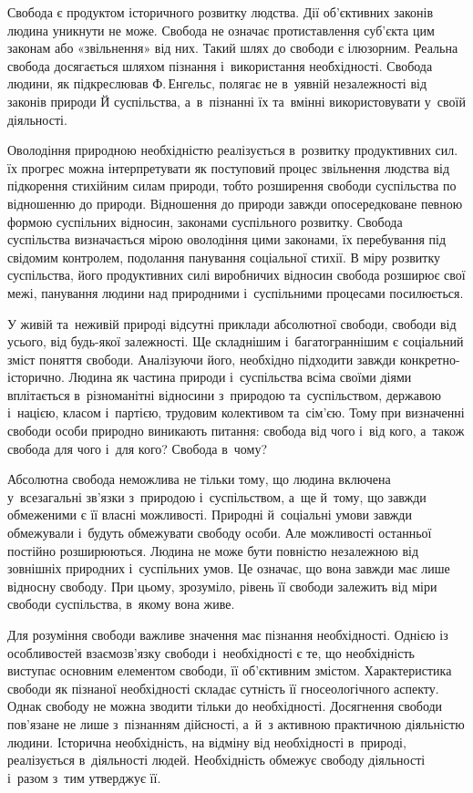\documentclass[a5paper,oneside,DIV=12,12pt,headings=small]{scrartcl}
\begin{document}
		Свобода є продуктом історичного розвитку людства. Дії об'\-єк\-тив\-них законів людина уникнути не може. Свобода не означає протиставлення суб'\-єкта цим законам або «звільнення» від них. Такий шлях до свободи є ілюзорним. Реальна свобода досягається шляхом пізнання і~використання необхідності. Свобода людини, як підкреслював Ф.\,Енгельс, полягає не в~уявній незалежності від законів природи Й суспільства, а~в~пізнанні їх та~вмінні використовувати у~своїй діяльності.
		
		Оволодіння природною необхідністю реалізується в~розвитку продуктивних сил. їх прогрес можна інтерпретувати як поступовий процес звільнення людства від підкорення стихійним силам природи, тобто розширення свободи суспільства по відношенню до природи. Відношення до природи завжди опосередковане певною формою суспільних відносин, законами суспільного розвитку. Свобода суспільства визначається мірою оволодіння цими законами, їх перебування під свідомим контролем, подолання панування соціальної стихії. В міру розвитку суспільства, його продуктивних силі виробничих відносин свобода розширює свої межі, панування людини над природними і~суспільними процесами посилюється.
		
		У живій та~неживій природі відсутні приклади абсолютної свободи, свободи від усього, від будь-якої залежності. Ще складнішим і~багатограннішим є соціальний зміст поняття свободи. Аналізуючи його, необхідно підходити завжди конкретно-історично. Людина як частина природи і~суспільства всіма своїми діями вплітається в~різноманітні відносини з~природою та~суспільством, державою і~нацією, класом і~партією, трудовим колективом та~сім'єю. Тому при визначенні свободи особи природно виникають питання: свобода від чого і~від кого, а~також свобода для чого і~для кого? Свобода в~чому?
		
		Абсолютна свобода неможлива не тільки тому, що людина включена у~всезагальні зв'язки з~природою і~суспільством, а~ще й~тому, що завжди обмеженими є її власні можливості. Природні й~соціальні умови завжди обмежували і~будуть обмежувати свободу особи. Але можливості останньої постійно розширюються. Людина не може бути повністю незалежною від зовнішніх природних і~суспільних умов. Це означає, що вона завжди має лише відносну свободу. При цьому, зрозуміло, рівень її свободи залежить від міри свободи суспільства, в~якому вона живе.
		
		Для розуміння свободи важливе значення має пізнання необхідності. Однією із особливостей взаємозв'язку свободи і~необхідності є те, що необхідність виступає основним елементом свободи, її об'\-єктивним змістом. Характеристика свободи як пізнаної необхідності складає сутність її гносеологічного аспекту. Однак свободу не можна зводити тільки до необхідності. Досягнення свободи пов'язане не лише з~пізнанням дійсності, а~й~з активною практичною діяльністю людини. Історична необхідність, на відміну від необхідності в~природі, реалізується в~діяльності людей. Необхідність обмежує свободу діяльності і~разом з~тим утверджує її.
		
\end{document}
